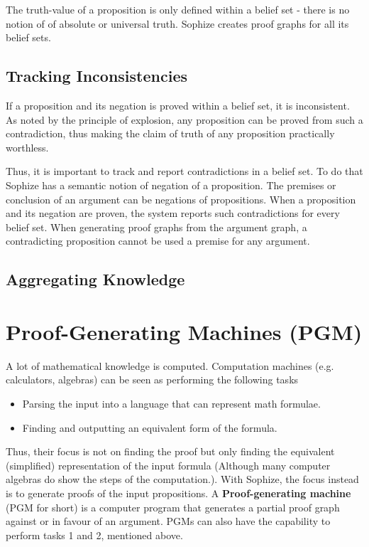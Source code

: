 \documentclass[a4paper]{article}
\begin{document}
The truth-value of a proposition is only defined within a belief set - there is no notion of of absolute or universal truth. Sophize creates proof graphs for all its belief sets.

\subsection{Tracking Inconsistencies}
If a proposition and its negation is proved within a belief set, it is inconsistent. As noted by the principle of explosion, any proposition can be proved from such a contradiction, thus making the claim of truth of any proposition practically worthless.

Thus, it is important to track and report contradictions in a belief set. To do that Sophize has a semantic notion of negation of a proposition. The premises or conclusion of an argument can be negations of propositions. When a proposition and its negation are proven, the system reports such contradictions for every belief set. When generating proof graphs from the argument graph, a contradicting proposition cannot be used a premise for any argument.

\subsection{Aggregating Knowledge}



\section{Proof-Generating Machines (PGM)}
\label{sec:pgm}
A lot of mathematical knowledge is computed. Computation machines (e.g. calculators, algebras) can be seen as performing the following tasks
\begin{itemize}
\item Parsing the input into a language that can represent math formulae. 
\item Finding and outputting an equivalent form of the formula.
\end{itemize}
Thus, their focus is not on finding the proof but only finding the equivalent (simplified) representation of the input formula (Although many computer algebras do show the steps of the computation.). With Sophize, the focus instead is to generate proofs of the input propositions. A \textbf{Proof-generating machine} (PGM for short) is a computer program that generates a partial proof graph against or in favour of an argument. PGMs can also have the capability to perform tasks 1 and 2, mentioned above.
\end{document}
